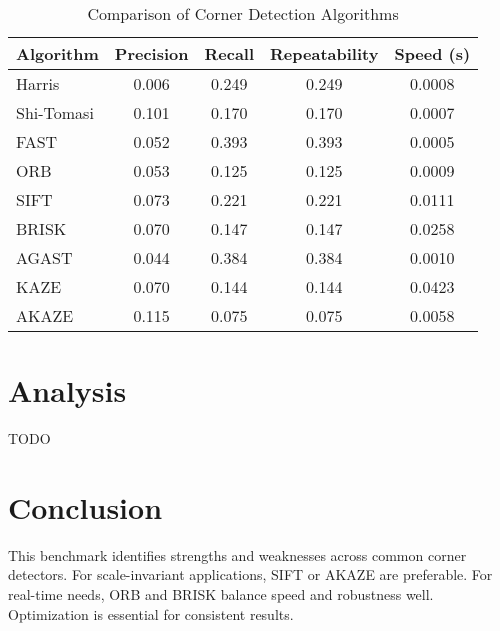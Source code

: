 \documentclass[journal]{IEEEtran}
\begin{document}
\begin{table}[h]
    \centering
    \caption{Comparison of Corner Detection Algorithms}
    \label{tab:corner_detection_comparison}
    \begin{tabular}{lcccc}
    \toprule
    \textbf{Algorithm} & \textbf{Precision} & \textbf{Recall} & \textbf{Repeatability} & \textbf{Speed (s)} \\
    \midrule
    Harris & 0.006 & 0.249 & 0.249 & 0.0008 \\
    Shi-Tomasi & 0.101 & 0.170 & 0.170 & 0.0007 \\
    FAST & 0.052 & 0.393 & 0.393 & 0.0005 \\
    ORB & 0.053 & 0.125 & 0.125 & 0.0009 \\
    SIFT & 0.073 & 0.221 & 0.221 & 0.0111 \\
    BRISK & 0.070 & 0.147 & 0.147 & 0.0258 \\
    AGAST & 0.044 & 0.384 & 0.384 & 0.0010 \\
    KAZE & 0.070 & 0.144 & 0.144 & 0.0423 \\
    AKAZE & 0.115 & 0.075 & 0.075 & 0.0058 \\
    \bottomrule
    \end{tabular}
    \end{table}

\section{Analysis}
TODO

\section{Conclusion}
This benchmark identifies strengths and weaknesses across common corner detectors. For scale-invariant applications, SIFT or AKAZE are preferable. For real-time needs, ORB and BRISK balance speed and robustness well. Optimization is essential for consistent results.




\end{document}
